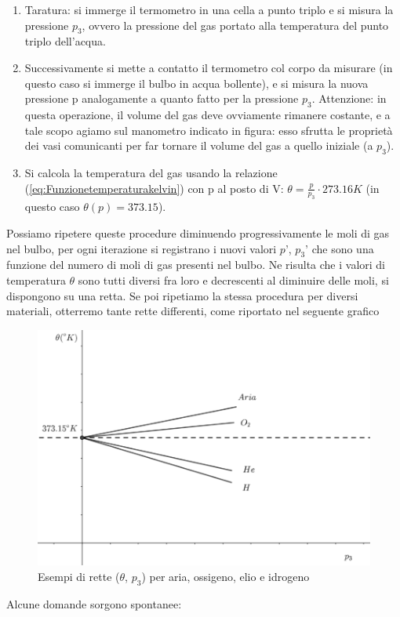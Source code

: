 \documentclass[10pt,a4paper]{article}
\begin{document}
\begin{enumerate}
	\item Taratura: si immerge il termometro in una cella a punto triplo e si misura la pressione $p_3$, ovvero la pressione del gas portato alla temperatura del punto triplo dell'acqua. 
	\item Successivamente si mette a contatto il termometro col corpo da misurare (in questo caso si immerge il bulbo in acqua bollente), e si misura la nuova pressione p analogamente a quanto fatto per la pressione $p_3$. Attenzione: in questa operazione, il volume del gas deve ovviamente rimanere costante, e a tale scopo agiamo sul manometro indicato in figura: esso sfrutta le proprietà dei vasi comunicanti per far tornare il volume del gas a quello iniziale (a $p_3$).
	\item Si calcola la temperatura del gas usando la relazione (\ref{eq:Funzionetemperaturakelvin}) con p al posto di V: $\theta = \frac{p}{p_3} \cdot 273.16 K$ (in questo caso $\theta(p) = 373.15$).
\end{enumerate}
Possiamo ripetere queste procedure diminuendo progressivamente le moli di gas nel bulbo, per ogni iterazione si registrano i nuovi valori $p’$, $p_3’$ che sono una funzione del numero di moli di gas presenti nel bulbo. Ne risulta che i valori di temperatura $\theta$ sono tutti diversi fra loro e decrescenti al diminuire delle moli, si dispongono su una retta. Se poi ripetiamo la stessa procedura per diversi materiali, otterremo tante rette differenti, come riportato nel seguente grafico
\begin{figure}[h!]
	\centering
	\includegraphics[width=0.7\linewidth]{../images/temp_e_puntotriplo}
	\caption{Esempi di rette ($\theta$, $p_3$) per aria, ossigeno, elio e idrogeno}
	\label{fig:tempepuntotriplo}
\end{figure}
\FloatBarrier
Alcune domande sorgono spontanee:
\end{document}
